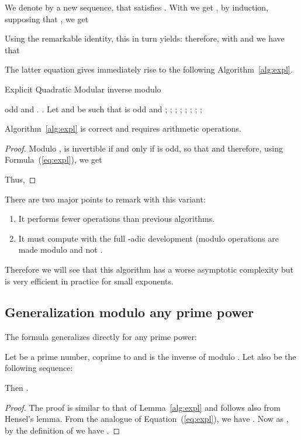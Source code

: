 We denote by  a new sequence, that
satisfies .
With  we get ,
by induction, supposing that , we get

Using the remarkable identity, this in turn yields:
 therefore, with
 and  we have that  


The latter equation gives immediately rise to the following Algorithm~\ref{alg:expl}. 

\begin{algorithm}[htbp]
\caption{Explicit Quadratic Modular inverse modulo }
\label{alg:expl}
\begin{algorithmic}[1]
\REQUIRE  odd and .
\ENSURE .
\STATE Let  and  be such that  is odd and ;
\STATE ;
\STATE ;
\FOR{(; ; )}
\STATE ; \hfill{}
\STATE ;\hfill\COMMENT{}
\STATE ; 
\STATE ;\hfill\COMMENT{}
\ENDFOR
\RETURN ;
\end{algorithmic}
\end{algorithm}

\begin{lemma} Algorithm~\ref{alg:expl} is correct and 
requires  arithmetic operations.
\end{lemma}
\begin{proof}
Modulo ,  is invertible if and only if  is odd, so that
 and therefore, using Formula~(\ref{eq:expl}), we get

Thus,

\end{proof}

There are two major points to remark with this variant:
\begin{enumerate}
\item It performs fewer operations than previous algorithms.
\item It must compute with the full -adic development (modulo operations are
  made modulo  and not .
\end{enumerate}
Therefore we will see that this algorithm has a worse asymptotic complexity
but is very efficient in practice for small exponents.

\subsection{Generalization modulo any prime power}
The formula generalizes directly for any prime power:
\begin{theorem}
Let  be a prime number,  coprime to  and  is the
inverse of  modulo .
Let also  be the following sequence:

Then .
\end{theorem}
\begin{proof}
The proof is similar to that of Lemma~\ref{alg:expl} and follows also from
Hensel's lemma.
From the analogue of Equation~(\ref{eq:expl}), we have . 
Now as , by the definition of  we have 
. 
\end{proof}

